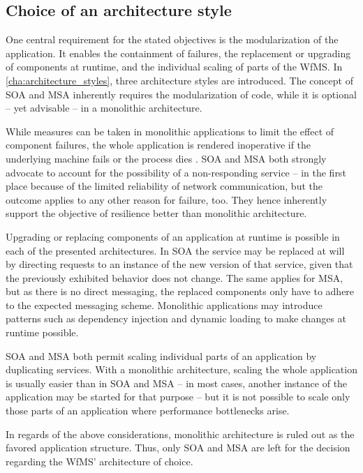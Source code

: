 
\subsection{Choice of an architecture style} %
  \label{sub:choice_of_an_achitecture_model}
  One central requirement for the stated objectives is the modularization of the application. It enables the containment of failures, the replacement or upgrading of components at runtime, and the individual scaling of parts of the \ac{WfMS}. In \ref{cha:architecture_styles}, three architecture styles are introduced. The concept of \ac{SOA} and \ac{MSA} inherently requires the modularization of code, while it is optional -- yet advisable -- in a monolithic architecture.

  While measures can be taken in monolithic applications to limit the effect of component failures, the whole application is rendered inoperative if the underlying machine fails or the process dies \cite[p.~55]{Newman2015Building}. \ac{SOA} and \ac{MSA} both strongly advocate to account for the possibility of a non-responding service -- in the first place because of the limited reliability of network communication, but the outcome applies to any other reason for failure, too. They hence inherently support the objective of resilience better than monolithic architecture.

  Upgrading or replacing components of an application at runtime is possible in each of the presented architectures. In \ac{SOA} the service may be replaced at will by directing requests to an instance of the new version of that service, given that the previously exhibited behavior does not change. The same applies for \ac{MSA}, but as there is no direct messaging, the replaced components only have to adhere to the expected messaging scheme. Monolithic applications may introduce patterns such as dependency injection and dynamic loading to make changes at runtime possible.

  \ac{SOA} and \ac{MSA} both permit scaling individual parts of an application by duplicating services.
  With a monolithic architecture, scaling the whole application is usually easier than in \ac{SOA} and \ac{MSA} -- in most cases, another instance of the application may be started for that purpose -- but it is not possible to scale only those parts of an application where performance bottlenecks arise.

  In regards of the above considerations, monolithic architecture is ruled out as the favored application structure. Thus, only \ac{SOA} and \ac{MSA} are left for the decision regarding the \ac{WfMS}' architecture of choice.

